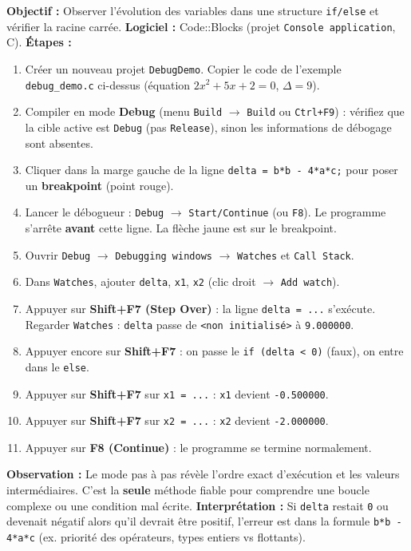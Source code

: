 \documentclass[11pt]{article}
\begin{document}
\begin{experience}
\textbf{Objectif :} Observer l'évolution des variables dans une structure \texttt{if/else} et vérifier la racine carrée.
\textbf{Logiciel :} Code::Blocks (projet \texttt{Console application}, C).
\textbf{Étapes :}
\begin{enumerate}
    \item Créer un nouveau projet \texttt{DebugDemo}. Copier le code de l'exemple \texttt{debug\_demo.c} ci-dessus (équation $2x^2+5x+2=0$, $\Delta=9$).
    \item Compiler en mode \textbf{Debug} (menu \texttt{Build} $\to$ \texttt{Build} ou \texttt{Ctrl+F9}) : vérifiez que la cible active est \texttt{Debug} (pas \texttt{Release}), sinon les informations de débogage sont absentes.
    \item Cliquer dans la marge gauche de la ligne \texttt{delta = b*b - 4*a*c;} pour poser un \textbf{breakpoint} (point rouge).
    \item Lancer le débogueur : \texttt{Debug} $\to$ \texttt{Start/Continue} (ou \texttt{F8}). Le programme s'arrête \textbf{avant} cette ligne. La flèche jaune est sur le breakpoint.
    \item Ouvrir \texttt{Debug} $\to$ \texttt{Debugging windows} $\to$ \texttt{Watches} et \texttt{Call Stack}.
    \item Dans \texttt{Watches}, ajouter \texttt{delta}, \texttt{x1}, \texttt{x2} (clic droit $\to$ \texttt{Add watch}).
    \item Appuyer sur \textbf{Shift+F7 (Step Over)} : la ligne \texttt{delta = ...} s'exécute. Regarder \texttt{Watches} : \texttt{delta} passe de \texttt{<non initialisé>} à \texttt{9.000000}.
    \item Appuyer encore sur \textbf{Shift+F7} : on passe le \texttt{if (delta < 0)} (faux), on entre dans le \texttt{else}.
    \item Appuyer sur \textbf{Shift+F7} sur \texttt{x1 = ...} : \texttt{x1} devient \texttt{-0.500000}.
    \item Appuyer sur \textbf{Shift+F7} sur \texttt{x2 = ...} : \texttt{x2} devient \texttt{-2.000000}.
    \item Appuyer sur \textbf{F8 (Continue)} : le programme se termine normalement.
\end{enumerate}
\textbf{Observation :} Le mode pas à pas révèle l'ordre exact d'exécution et les valeurs intermédiaires. C'est la \textbf{seule} méthode fiable pour comprendre une boucle complexe ou une condition mal écrite.
\textbf{Interprétation :} Si \texttt{delta} restait \texttt{0} ou devenait négatif alors qu'il devrait être positif, l'erreur est dans la formule \texttt{b*b - 4*a*c} (ex. priorité des opérateurs, types entiers vs flottants).
\end{experience}
\end{document}

